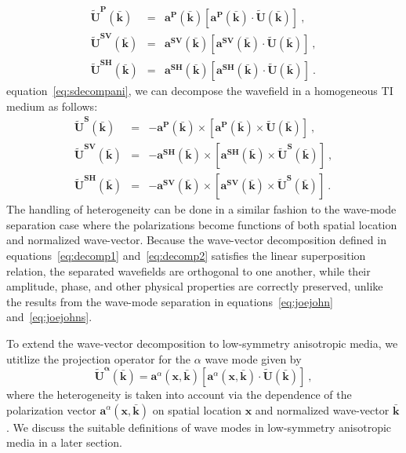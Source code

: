 		\begin{eqnarray}
		\label{eq:decomp1}
			\mathbf{\widetilde{U}^{P}}(\mathbf{\bar{k}}) & = & \mathbf{a^{P}}(\mathbf{\bar{k}})[\mathbf{a^{P}}(\mathbf{\bar{k}})\cdot\mathbf{\widetilde{U}}(\mathbf{\bar{k}})]~,\\
			\nonumber
			\mathbf{\widetilde{U}^{SV}}(\mathbf{\bar{k}}) & = & \mathbf{a^{SV}}(\mathbf{\bar{k}})[\mathbf{a^{SV}}(\mathbf{\bar{k}})\cdot\mathbf{\widetilde{U}}(\mathbf{\bar{k}})]~,\\
			\nonumber
			\mathbf{\widetilde{U}^{SH}}(\mathbf{\bar{k}}) & = & \mathbf{a^{SH}}(\mathbf{\bar{k}})[\mathbf{a^{SH}}(\mathbf{\bar{k}})\cdot\mathbf{\widetilde{U}}(\mathbf{\bar{k}})]~.
		\end{eqnarray}
 equation~\ref{eq:sdecompani}, we can decompose the wavefield in a homogeneous TI medium as follows:
		\begin{eqnarray}
		\label{eq:decomp2}
			\mathbf{\widetilde{U}^{S}}(\mathbf{\bar{k}}) & = & -\mathbf{a^{P}}(\mathbf{\bar{k}})\times[\mathbf{a^{P}}(\mathbf{\bar{k}})\times\mathbf{\widetilde{U}}(\mathbf{\bar{k}})]~,\\
			\nonumber
			\mathbf{\widetilde{U}^{SV}}(\mathbf{\bar{k}}) & = & -\mathbf{a^{SH}}(\mathbf{\bar{k}})\times[\mathbf{a^{SH}}(\mathbf{\bar{k}})\times\mathbf{\widetilde{U}^{S}}(\mathbf{\bar{k}})]~,\\
			\nonumber
			\mathbf{\widetilde{U}^{SH}}(\mathbf{\bar{k}}) & = & -\mathbf{a^{SV}}(\mathbf{\bar{k}})\times[\mathbf{a^{SV}}(\mathbf{\bar{k}})\times\mathbf{\widetilde{U}^{S}}(\mathbf{\bar{k}})]~.
		\end{eqnarray}
The handling of heterogeneity can be done in a similar fashion to the wave-mode separation case where the polarizations become functions of both spatial location and normalized wave-vector. Because the wave-vector decomposition defined in equations~\ref{eq:decomp1} and~\ref{eq:decomp2} satisfies the linear superposition relation, the  separated wavefields are orthogonal to one another, while their amplitude, phase, and other physical properties are correctly preserved, unlike the results from the wave-mode separation in equations~\ref{eq:joejohn} and~\ref{eq:joejohns}.

To extend the wave-vector decomposition to low-symmetry anisotropic media, we  utitlize the projection operator for the $\alpha$ wave mode given by
\begin{equation}
\label{eq:decompaniop}
\mathbf{\widetilde{U}^{\alpha}}(\mathbf{\bar{k}})  = \mathbf{a}^{\alpha}(\mathbf{x},\mathbf{\bar{k}})[\mathbf{a}^{\alpha}(\mathbf{x},\mathbf{\bar{k}})\cdot\mathbf{\widetilde{U}(\bar{k})}]~,
\end{equation}
where the heterogeneity is taken into account via the dependence of the polarization vector $\mathbf{a}^{\alpha}(\mathbf{x},\mathbf{\bar{k}})$ on spatial location $\mathbf{x}$ and normalized wave-vector $\mathbf{\bar{k}}$. We discuss the suitable definitions of wave modes in low-symmetry anisotropic media in a later section.


